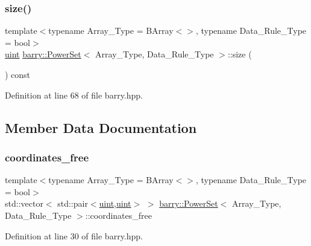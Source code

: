 \subsubsection{\texorpdfstring{size()}{size()}}
{\footnotesize\ttfamily template$<$typename Array\+\_\+\+Type  = B\+Array$<$$>$, typename Data\+\_\+\+Rule\+\_\+\+Type  = bool$>$ \\
\hyperlink{namespacebarry_a11dfc53ddb4672278319aa04f1e09a6c}{uint} \hyperlink{classbarry_1_1_power_set}{barry\+::\+Power\+Set}$<$ Array\+\_\+\+Type, Data\+\_\+\+Rule\+\_\+\+Type $>$\+::size (\begin{DoxyParamCaption}{ }\end{DoxyParamCaption}) const\hspace{0.3cm}{\ttfamily [inline]}}



Definition at line 68 of file barry.\+hpp.



\subsection{Member Data Documentation}
\mbox{\label{classbarry_1_1_power_set_a2bc42422f23546d55fef96f053c0c4ea}} 
\subsubsection{\texorpdfstring{coordinates\+\_\+free}{coordinates\_free}}
{\footnotesize\ttfamily template$<$typename Array\+\_\+\+Type  = B\+Array$<$$>$, typename Data\+\_\+\+Rule\+\_\+\+Type  = bool$>$ \\
std\+::vector$<$ std\+::pair$<$\hyperlink{namespacebarry_a11dfc53ddb4672278319aa04f1e09a6c}{uint},\hyperlink{namespacebarry_a11dfc53ddb4672278319aa04f1e09a6c}{uint}$>$ $>$ \hyperlink{classbarry_1_1_power_set}{barry\+::\+Power\+Set}$<$ Array\+\_\+\+Type, Data\+\_\+\+Rule\+\_\+\+Type $>$\+::coordinates\+\_\+free}



Definition at line 30 of file barry.\+hpp.

\mbox{\label{classbarry_1_1_power_set_a46fa867445a84be388ee62602922980a}} 
